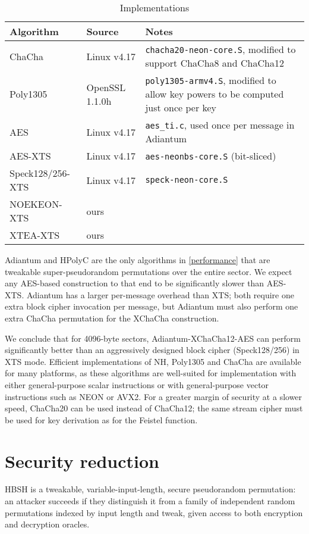 \documentclass[journal=tosc,preprint,floatrow,submission]{iacrtrans}
\begin{document}
\begin{table}
    \caption{Implementations}
    \label{implementation}
    \centering
    \begin{tabular}{llp{7cm}}
        Algorithm & Source & Notes \\
    \hline
    ChaCha & Linux v4.17 & \texttt{chacha20-neon-core.S}, modified to support ChaCha8 and ChaCha12 \\
    Poly1305 & OpenSSL 1.1.0h & \texttt{poly1305-armv4.S}, modified to allow key
    powers to be computed just once per key \\
    \mbox{AES} & Linux v4.17 & \texttt{aes\_ti.c}, used once per message in Adiantum \\
    \mbox{AES-XTS} & Linux v4.17 & \texttt{aes-neonbs-core.S} (bit-sliced) \\
    \mbox{Speck128/256-XTS} & Linux v4.17 & \texttt{speck-neon-core.S} \\
    \mbox{NOEKEON-XTS} & ours & \\
    \mbox{XTEA-XTS} & ours & \\
    \end{tabular}
\end{table}

Adiantum and HPolyC are the only algorithms in \autoref{performance} that are tweakable
super-pseudorandom permutations over the entire sector.  We expect any AES-based
construction to that end to be significantly slower than \mbox{AES-XTS}.
Adiantum has a larger per-message overhead than XTS; both require one
extra block cipher invocation per message, but Adiantum must also perform one extra
ChaCha permutation for the XChaCha construction.

We conclude that for 4096-byte sectors, \mbox{Adiantum-XChaCha12-AES} can perform
significantly better than an aggressively designed block cipher (\mbox{Speck128/256}) in XTS mode.
Efficient implementations of NH, Poly1305 and ChaCha are available for many
platforms, as these algorithms are well-suited for implementation with either
general-purpose scalar instructions or with general-purpose vector instructions
such as NEON or AVX2.
For a greater margin of security at a slower speed, ChaCha20 can
be used instead of ChaCha12; the same stream cipher
must be used for key derivation as for the Feistel function.

\section{Security reduction}
HBSH is a tweakable, variable-input-length, secure pseudorandom permutation: an attacker
succeeds if they distinguish it from a family of independent random permutations indexed by
input length and tweak, given access to both encryption and decryption oracles.
\end{document}
